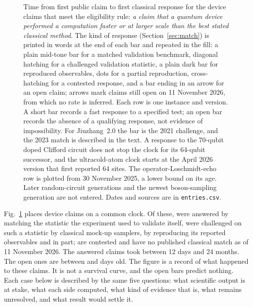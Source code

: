 \documentclass[10pt,a4paper]{article}
\begin{document}
\begin{figure}[htbp]
\caption[Time from quantum claim to classical response]{Time from first public claim to first classical response for the \nTimeline{} device claims that meet the eligibility rule: \emph{a claim that a quantum device performed a computation faster or at larger scale than the best stated classical method}. The kind of response (Section~\ref{sec:match}) is printed in words at the end of each bar and repeated in the fill: a plain mid-tone bar for a matched validation benchmark, diagonal hatching for a challenged validation statistic, a plain dark bar for reproduced observables, dots for a partial reproduction, cross-hatching for a contested response, and a bar ending in an arrow for an open claim; arrows mark claims still open on 11 November 2026, from which no rate is inferred. Each row is one instance and version. A short bar records a fast response to a specified test; an open bar records the absence of a qualifying response, not evidence of impossibility. For Jiuzhang~2.0 the bar is the 2021 challenge, and the 2023 match is described in the text. A response to the 70-qubit doped Clifford circuit does not stop the clock for its 64-qubit successor, and the ultracold-atom clock starts at the April 2026 version that first reported 64 sites. The operator-Loschmidt-echo row is plotted from 30 November 2025, a lower bound on its age. Later random-circuit generations and the newest boson-sampling generation are not entered. Dates and sources are in \texttt{entries.csv}.}
\label{fig:timeline}
\end{figure}

Fig.~\ref{fig:timeline} places \nTimeline{} device claims on a common clock. Of these, \wTLvalidation{} were answered by matching the statistic the experiment used to validate itself, \wTLchallenged{} were challenged on such a statistic by classical mock-up samplers, \wTLobservables{} by reproducing its reported observables and \wTLpartial{} in part; \wTLcontested{} are contested and \wTLopen{} have no published classical match as of 11 November 2026. The answered claims took between 12 days and 24 months. The open ones are between  and  days old. The figure is a record of what happened to these claims. It is not a survival curve, and the open bars predict nothing. Each case below is described by the same five questions: what scientific output is at stake, what each side computed, what kind of evidence that is, what remains unresolved, and what result would settle it.
\end{document}
